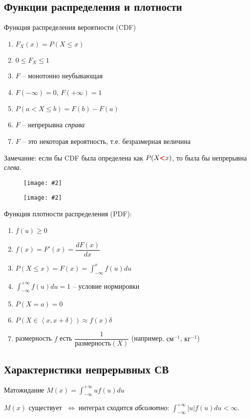 \documentclass[a4paper,12pt]{article}
\newenvironment{onsamepage} {\begin{minipage}{\textwidth}} {\end{minipage}}
\numberwithin{figure}{section}
\newcommand\cfigure[2]{
	\begin{figure}[H] \centering \texttt{[image: \#2]} \end{figure}
}
\theoremstyle{definition}
\let\DS\displaystyle
\let\leqs\leqslant
\let\geqs\geqslant
\def\iff{$\;\Longleftrightarrow\;$}
\begin{document}
\subsection{Функции распределения и плотности}

Функция распределения вероятности (CDF)
\begin{enumerate}
	\item $F_X(x) = P(X \leqs x)$
	\item $0\leqs F_X \leqs 1$
	\item $F$ -- монотонно неубывающая
	\item $F(-\infty)=0$, $F(+\infty)=1$
	\item $P(a< X \leqs b) = F(b)-F(a)$
	\item $F$ -- непрерывна \textit{справа}
	\item $F$ -- это некоторая вероятность, т.е. безразмерная величина
\end{enumerate}

Замечание: если бы CDF была определена как
$P(X {\pmb{\textcolor{red}<}} x)$,
то была бы непрерывна \textit{слева}.

\cfigure{11cm}{cdf-example-big.png}

\cfigure{6cm}{cdf-example-small.jpg}

Функция плотности распределения (PDF):
\begin{enumerate}
	\item $f(u) \geqs 0$
	\item $f(x)=F'(x)=\dfrac{dF(x)}{dx}$
	\item $\DS P(X\leqs x)=F(x)=\int_{-\infty}^{x}f(u)du$
	\item $\DS \int_{-\infty}^{+\infty}f(u)du=1$ -- условие нормировки
	\item $P(X=a)=0$
	\item $P(X \in \left<x,x+\delta\right>) \approx f(x) \delta$
	\item размерность $f$ есть $\dfrac{1}{\text{размерность}(X)}$
		  (например, $\text{см}^{-1}$, $\text{кг}^{-1}$)
\end{enumerate}


\subsection{Характеристики непрерывных СВ}

\begin{onsamepage}
Матожидание $\DS M(x)=\int_{-\infty}^{+\infty}uf(u)du$

$M(x)$ существует \iff интеграл сходится \textit{абсолютно}:
$\DS \int_{-\infty}^{+\infty}|u|f(u)du < \infty$.
\end{onsamepage}
\end{document}
